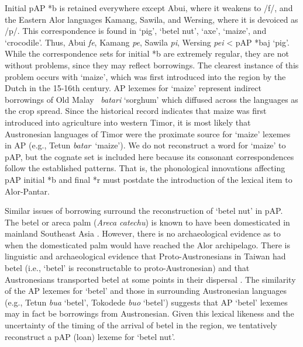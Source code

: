 Initial pAP *b is retained everywhere except Abui, where it weakens to /f/, and the Eastern Alor languages Kamang, Sawila, and Wersing, where it is devoiced as /p/. This correspondence is found in `pig', `betel nut', `axe', `maize', and `crocodile'. Thus, Abui \textit{fe}, Kamang \textit{pe}, Sawila \textit{pi}, Wersing \textit{pei} {\textless} pAP *baj `pig'. While the correspondence sets for initial *b are extremely regular, they are not without problems, since they may reflect borrowings. The clearest instance of this problem occurs with `maize', which was first introduced into the region by the Dutch in the 15-16th century. AP lexemes for `maize' represent indirect borrowings of Old Malay ~\textit{batari }`sorghum' which diffused across the languages as the crop spread. Since the historical record indicates that maize was first introduced into agriculture into western Timor, it is most likely that Austronesian languages of Timor were the proximate source for `maize' lexemes in AP (e.g., Tetun \textit{
batar}~`maize'). We do not reconstruct a word for `maize' to pAP, but the cognate set is included here because its consonant correspondences follow the established patterns. That is, the phonological innovations affecting pAP initial *b and final *r must postdate the introduction of the lexical item to Alor-Pantar. 

Similar issues of borrowing surround the reconstruction of `betel nut' in pAP. The betel or areca palm (\textit{Areca catechu}) is known to have been domesticated in mainland Southeast Asia \citep{Yen1977}. However, there is no archaeological evidence as to when the domesticated palm would have reached the Alor archipelago. There is linguistic and archaeological evidence that Proto-Austronesians in Taiwan had betel (i.e., `betel' is reconstructable to proto-Austronesian) and that Austronesians transported betel at some points in their dispersal \citep{Lichtenberk1998}. The similarity of the AP lexemes for `betel' and those in surrounding Austronesian languages (e.g., Tetun \textit{bua} `betel', Tokodede \textit{buo} `betel') suggests that AP `betel' lexemes may in fact be borrowings from Austronesian. Given this lexical likeness and the uncertainty of the timing of the arrival of betel in the region, we tentatively reconstruct a pAP (loan) lexeme for `betel nut'. 

